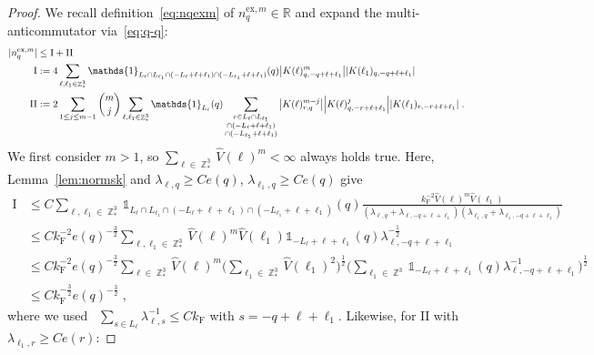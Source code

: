 \documentclass[12pt,a4paper]{article}
\numberwithin{equation}{section}
\newcommand{\RRR}{\mathbb{R}}
\newcommand{\1}{\mathbb{I}}
\newcommand{\ex}{\mathrm{ex}}
\newcommand{\F}{\mathrm{F}}
\newcommand{\I}{\mathrm{I}}
\newcommand{\II}{\mathrm{II}}
\DeclareMathOperator{\Z}{\mathbb{Z}}
\newcommand{\half}{\frac{1}{2}}
\theoremstyle{plain}
\theoremstyle{definition}
\theoremstyle{remark}
\theoremstyle{plain}
\theoremstyle{definition}
\theoremstyle{remark}
\begin{document}
\begin{proof}
We recall definition~\eqref{eq:nqexm} of $ n_q^{\ex,m} \in \RRR $ and expand the multi-anticommutator via~\eqref{eq:q-q}:
\begin{equation}
\begin{aligned}
	|n_q^{\ex,m}|
	&\leq \I + \II \\
	\I
	&:= 4 \sum_{\ell,\ell_1 \in \Z^3_*}
		\mathds{1}_{L_\ell \cap L_{\ell_1} \cap (-L_\ell + \ell + \ell_1) \cap (-L_{\ell_1} + \ell + \ell_1)}(q)
		\abs{K(\ell)^m_{q,-q+\ell+\ell_1}}
		\abs{K(\ell_1)_{q,-q+\ell+\ell_1}} \\
	\II
	&:= 2 \sum_{1 \le j \le m-1} {{m}\choose j} \sum_{\ell,\ell_1 \in \Z^3_*}
		\mathds{1}_{L_\ell}(q)
		\sum_{\substack{r\in L_{\ell} \cap L_{\ell_1}\\ \cap (-L_{\ell}+\ell+\ell_1) \\ \cap (-L_{\ell_1}+\ell+\ell_1 )}}
		\abs{K(\ell)^{m-j}_{r,q}}
		\abs{K(\ell)^j_{q,-r+\ell+\ell_1}}
		\abs{K(\ell_1)_{r,-r+\ell+\ell_1}} \;.
\end{aligned}
\end{equation}
We first consider $ m > 1 $, so $ \sum_{\ell \in \Z^3_*} \hat{V}(\ell)^m < \infty $ always holds true. Here, Lemma~\ref{lem:normsk} and $  \lambda_{\ell,q} \geq C e(q) $, $ \lambda_{\ell_1,q} \geq C e(q) $ give
\begin{equation}
\begin{aligned}
	\I
	&\leq C \sum_{\ell,\ell_1 \in \Z^3_*}
		\mathds{1}_{L_\ell \cap L_{\ell_1} \cap (-L_\ell + \ell + \ell_1) \cap (-L_{\ell_1} + \ell + \ell_1)}(q)
		\frac{k_{\F}^{-2} \hat{V}(\ell)^m \hat{V}(\ell_1)}{(\lambda_{\ell,q} + \lambda_{\ell,-q+\ell+\ell_1}) (\lambda_{\ell_1,q} + \lambda_{\ell_1,-q+\ell+\ell_1})} \\
	&\leq C k_{\F}^{-2} e(q)^{-\frac 32} \sum_{\ell,\ell_1 \in \Z^3_*} \hat{V}(\ell)^m \hat{V}(\ell_1)
		\mathds{1}_{-L_\ell + \ell + \ell_1}(q)
		\lambda_{\ell,-q+\ell+\ell_1}^{-\frac 12} \\ 
	&\leq C k_{\F}^{-2} e(q)^{-\frac 32} \sum_{\ell \in \Z^3_*} \hat{V}(\ell)^m
		\Bigg( \sum_{\ell_1 \in \Z^3_*} \hat{V}(\ell_1)^2 \Bigg)^{\half}
		\Bigg( \sum_{\ell_1 \in \Z^3} \mathds{1}_{-L_\ell + \ell + \ell_1}(q)
		\lambda_{\ell,-q+\ell+\ell_1}^{-1} \Bigg)^{\half} \\
	&\leq C k_{\F}^{-\frac 32} e(q)^{-\frac 32} \;,
\end{aligned}
\end{equation}
where we used~\cite[Prop.~A.2]{CHN21} $ \sum_{s \in L_\ell} \lambda_{\ell,s}^{-1} \le C k_{\F} $ with $ s = -q+\ell+\ell_1 $. Likewise, for $ \II $ with $ \lambda_{\ell_1,r} \ge C e(r) $:

\end{proof}
\end{document}
